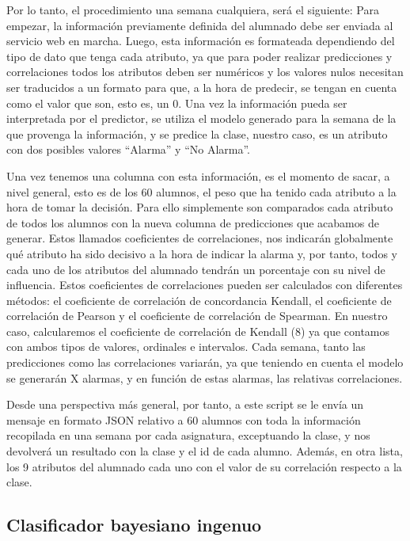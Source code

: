Por lo tanto, el procedimiento una semana cualquiera, será el
siguiente: Para empezar, la información previamente definida del
alumnado debe ser enviada al servicio web en marcha. Luego, esta
información es formateada dependiendo del tipo de dato que tenga cada
atributo, ya que para poder realizar predicciones y correlaciones
todos los atributos deben ser numéricos y los valores nulos necesitan
ser traducidos a un formato para que, a la hora de predecir, se tengan
en cuenta como el valor que son, esto es, un 0. Una vez la información
pueda ser interpretada por el predictor, se utiliza el modelo generado
para la semana de la que provenga la información, y se predice la
clase, nuestro caso, es un atributo con dos posibles valores “Alarma”
y “No Alarma”.

Una vez tenemos una columna con esta información, es el momento de
sacar, a nivel general, esto es de los 60 alumnos, el peso que ha
tenido cada atributo a la hora de tomar la decisión. Para ello
simplemente son comparados cada atributo de todos los alumnos con la
nueva columna de predicciones que acabamos de generar. Estos llamados
coeficientes de correlaciones, nos indicarán globalmente qué atributo
ha sido decisivo a la hora de indicar la alarma y, por tanto, todos y
cada uno de los atributos del alumnado tendrán un porcentaje con su
nivel de influencia. Estos coeficientes de correlaciones pueden ser
calculados con diferentes métodos: el coeficiente de correlación de
concordancia Kendall, el coeficiente de correlación de Pearson y el
coeficiente de correlación de Spearman. En nuestro caso, calcularemos
el coeficiente de correlación de Kendall (8) ya que contamos con ambos
tipos de valores, ordinales e intervalos.  Cada semana, tanto las
predicciones como las correlaciones variarán, ya que teniendo en
cuenta el modelo se generarán X alarmas, y en función de estas
alarmas, las relativas correlaciones.

Desde una perspectiva más general, por tanto, a este script se le
envía un mensaje en formato JSON relativo a 60 alumnos con toda la
información recopilada en una semana por cada asignatura, exceptuando
la clase, y nos devolverá un resultado con la clase y el id de cada
alumno. Además, en otra lista, los 9 atributos del alumnado cada uno
con el valor de su correlación respecto a la clase.

\subsection{Clasificador bayesiano ingenuo}
